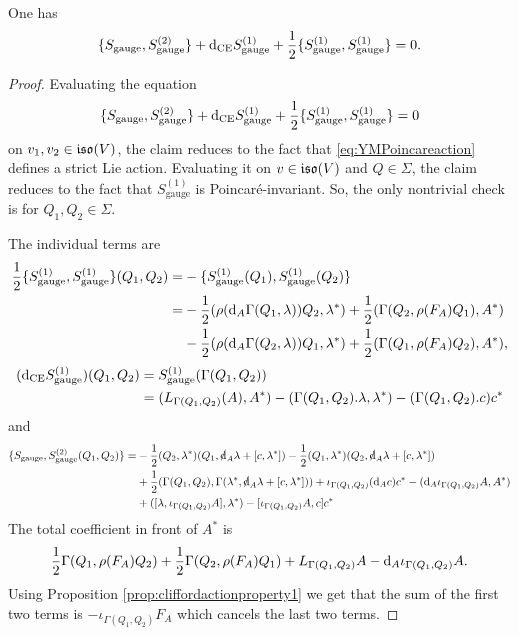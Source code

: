 \documentclass[10pt, oneside]{article}
\newcommand{\gauge}{\mathrm{gauge}}
\begin{document}
\begin{lemma}
One has
\[\{S_{\gauge}, S_{\gauge}^{(2)}\} + \d_{\mr{CE}} S_{\gauge}^{(1)} + \frac{1}{2}\{S_{\gauge}^{(1)}, S_{\gauge}^{(1)}\} = 0.\]
\label{lm:gaugemultiplet2}
\end{lemma}
\begin{proof}
Evaluating the equation
\[\{S_{\gauge}, S_{\gauge}^{(2)}\} + \d_{\mr{CE}} S_{\gauge}^{(1)} + \frac{1}{2}\{S_{\gauge}^{(1)}, S_{\gauge}^{(1)}\} = 0\]
on $v_1, v_2\in \mathfrak{iso}(V)$, the claim reduces to the fact that \eqref{eq:YMPoincareaction} defines a strict Lie action. Evaluating it on $v\in\mathfrak{iso}(V)$ and $Q\in\Sigma$, the claim reduces to the fact that $S_{\gauge}^{(1)}$ is Poincar\'{e}-invariant. So, the only nontrivial check is for $Q_1,Q_2\in\Sigma$.

The individual terms are
\begin{align*}
\frac{1}{2}\{S_{\gauge}^{(1)}, S_{\gauge}^{(1)}\}(Q_1, Q_2) = &-\{S_{\gauge}^{(1)}(Q_1), S_{\gauge}^{(1)}(Q_2)\} \\
= &-\frac{1}{2}(\rho(\d_A \Gamma(Q_1, \lambda)) Q_2, \lambda^*) + \frac{1}{2}(\Gamma(Q_2, \rho(F_A)Q_1), A^*) \\
&-\frac{1}{2}(\rho(\d_A \Gamma(Q_2, \lambda)) Q_1, \lambda^*) + \frac{1}{2}(\Gamma(Q_1, \rho(F_A)Q_2), A^*),
\end{align*}
\begin{align*}
(\d_{\mr{CE}} S_{\gauge}^{(1)})(Q_1, Q_2) &= S_{\gauge}^{(1)}(\Gamma(Q_1, Q_2)) \\
&= (L_{\Gamma(Q_1, Q_2)}(A), A^*) -(\Gamma(Q_1, Q_2).\lambda, \lambda^*) - (\Gamma(Q_1, Q_2).c) c^*
\end{align*}
and
\begin{align*}
\{S_{\gauge}, S_{\gauge}^{(2)}(Q_1, Q_2)\} = &-\frac{1}{2}(Q_2, \lambda^*)(Q_1, \sd{\d}_A \lambda + [c, \lambda^*]) - \frac{1}{2}(Q_1, \lambda^*)(Q_2, \sd{\d}_A \lambda + [c, \lambda^*]) \\
&+\frac{1}{2}(\Gamma(Q_1, Q_2), \Gamma(\lambda^*, \sd{\d}_A \lambda + [c, \lambda^*])) + \iota_{\Gamma(Q_1, Q_2)}(\d_A c) c^* - (\d_A\iota_{\Gamma(Q_1, Q_2)} A, A^*) \\
&+ ([\lambda, \iota_{\Gamma(Q_1, Q_2)}A], \lambda^*) - [\iota_{\Gamma(Q_1, Q_2)} A, c] c^*
\end{align*}
The total coefficient in front of $A^*$ is
\[\frac{1}{2}\Gamma(Q_1, \rho(F_A)Q_2) + \frac{1}{2}\Gamma(Q_2, \rho(F_A) Q_1) + L_{\Gamma(Q_1, Q_2)} A - {\rm d}_A \iota_{\Gamma(Q_1, Q_2)} A.\]
Using Proposition \ref{prop:cliffordactionproperty1} we get that the sum of the first two terms is $-\iota_{\Gamma(Q_1, Q_2)}F_A$ which cancels the last two terms.


\end{proof}
\end{document}
